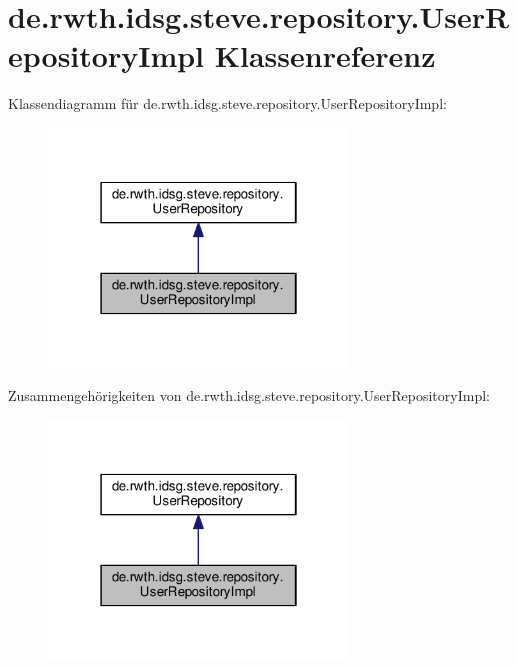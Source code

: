 \hypertarget{classde_1_1rwth_1_1idsg_1_1steve_1_1repository_1_1_user_repository_impl}{\section{de.\-rwth.\-idsg.\-steve.\-repository.\-User\-Repository\-Impl Klassenreferenz}
\label{classde_1_1rwth_1_1idsg_1_1steve_1_1repository_1_1_user_repository_impl}
}


Klassendiagramm für de.\-rwth.\-idsg.\-steve.\-repository.\-User\-Repository\-Impl\-:
\nopagebreak
\begin{figure}[H]
\begin{center}
\leavevmode
\includegraphics[width=226pt]{classde_1_1rwth_1_1idsg_1_1steve_1_1repository_1_1_user_repository_impl__inherit__graph}
\end{center}
\end{figure}


Zusammengehörigkeiten von de.\-rwth.\-idsg.\-steve.\-repository.\-User\-Repository\-Impl\-:
\nopagebreak
\begin{figure}[H]
\begin{center}
\leavevmode
\includegraphics[width=226pt]{classde_1_1rwth_1_1idsg_1_1steve_1_1repository_1_1_user_repository_impl__coll__graph}
\end{center}
\end{figure}
